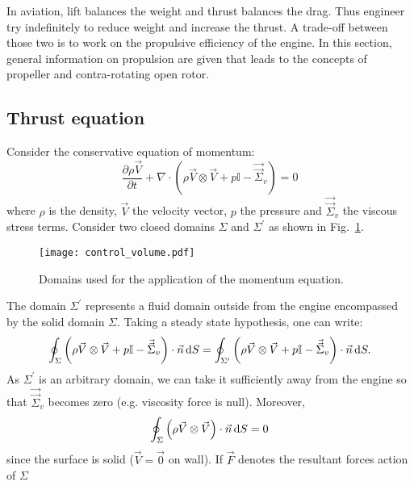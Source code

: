 
In aviation, lift balances the weight and 
thrust balances the drag. Thus engineer try
indefinitely to reduce weight and increase the
thrust. A trade-off between those two is to work
on the propulsive efficiency of the engine. In this
section, general information on propulsion are given
that leads to the concepts of propeller and
contra-rotating open rotor.

\subsection{Thrust equation}
\label{sub:cror_thrust}
Consider the conservative equation of momentum:
\begin{equation}
	\frac{\partial \rho \vec{V}}{\partial t} 
	+ \nabla \cdot (\rho \vec{V} \otimes \vec{V} + p \mathbb{I} - \vec{\vec{\Sigma}}_v) = 0
\end{equation}
where $\rho$ is the density, $\vec{V}$ the velocity vector, $p$ the pressure and
$\vec{\vec{\Sigma}}_v$ the viscous stress terms.
Consider two closed domains $\Sigma$ and $\Sigma^\prime$ as
shown in Fig.~\ref{fig:cror_control_volume}.
\begin{figure}[htb]
  \centering
  \texttt{[image: control\_volume.pdf]}
  \caption{Domains used for the application of the momentum equation.}
  \label{fig:cror_control_volume}
\end{figure}
The domain $\Sigma^\prime$ represents a fluid domain outside from the
engine encompassed by the solid domain $\Sigma$.
Taking a steady state hypothesis, one can write:
\begin{equation}
	\oint_{\Sigma} \left(\rho \vec{V} \otimes \vec{V} + 
	                       p \mathbb{I} - 
	                       \vec{\vec{\Sigma}}_v \right) \cdot \vec{n} \mathop{}\!\mathrm{d} S
    =
   	\oint_{\Sigma^\prime} \left(\rho \vec{V} \otimes \vec{V} + 
	                       p \mathbb{I} - 
	                       \vec{\vec{\Sigma}}_v \right) \cdot \vec{n} \mathop{}\!\mathrm{d} S.
\end{equation} 
As $\Sigma^\prime$ is an arbitrary domain, we can take it sufficiently
away from the engine so that $\vec{\vec{\Sigma}}_v$ becomes zero (e.g.
viscosity force is null).
Moreover, 
\begin{equation}
	\oint_{\Sigma} \left(\rho \vec{V} \otimes \vec{V} \right) \cdot \vec{n} \mathop{}\!\mathrm{d} S = 0
\end{equation}
since the surface is solid ($\vec{V} = \vec{0}$ on wall). 
If $\vec{F}$ denotes the resultant forces action of $\Sigma$
